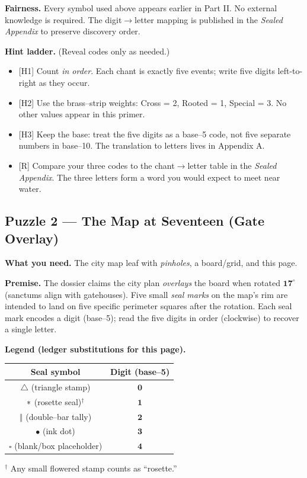 \documentclass[11pt]{article}
\numberwithin{equation}{section} %
\theoremstyle{plain} %
\theoremstyle{definition} %
\theoremstyle{remark} %
\begin{document}
\medskip
\noindent\textbf{Fairness.} Every symbol used above appears earlier in Part II. No external knowledge is required. The digit\(\to\)letter mapping is published in the \emph{Sealed Appendix} to preserve discovery order.

\medskip
\noindent\textbf{Hint ladder.} (Reveal codes only as needed.)
\begin{itemize}\setlength\itemsep{0.25em}
  \item \textsc{[H1]} Count \emph{in order}. Each chant is exactly five events; write five digits left-to-right as they occur.
  \item \textsc{[H2]} Use the brass–strip weights: Cross = 2, Rooted = 1, Special = 3. No other values appear in this primer.
  \item \textsc{[H3]} Keep the base: treat the five digits as a base–5 code, not five separate numbers in base–10. The translation to letters lives in Appendix A.
  \item \textsc{[R]} Compare your three codes to the chant\(\to\)letter table in the \emph{Sealed Appendix}. The three letters form a word you would expect to meet near water.
\end{itemize}

\subsection{Puzzle 2 — The Map at Seventeen (Gate Overlay)}
\label{pz:map-at-seventeen}

\noindent\textbf{What you need.} The city map leaf with \emph{pinholes}, a board/grid, and this page.

\medskip
\noindent\textbf{Premise.} The dossier claims the city plan \emph{overlays} the board when rotated \(\mathbf{17^\circ}\) (sanctums align with gatehouses). Five small \emph{seal marks} on the map’s rim are intended to land on five specific perimeter squares after the rotation. Each seal mark encodes a digit (base–5); read the five digits in order (clockwise) to recover a single letter.

\medskip
\noindent\textbf{Legend (ledger substitutions for this page).}
\begin{center}
\begin{tabular}{c|c}
\textbf{Seal symbol} & \textbf{Digit (base–5)} \\
\hline
\(\triangle\) (triangle stamp) & \(\mathbf{0}\) \\
\(\large\ast\) (rosette seal)\(^\dagger\) & \(\mathbf{1}\) \\
\(\Vert\) (double–bar tally) & \(\mathbf{2}\) \\
\(\bullet\) (ink dot) & \(\mathbf{3}\) \\
\(\square\) (blank/box placeholder) & \(\mathbf{4}\) \\
\end{tabular}
\end{center}
\noindent\(^\dagger\) Any small flowered stamp counts as “rosette.”
\end{document}
